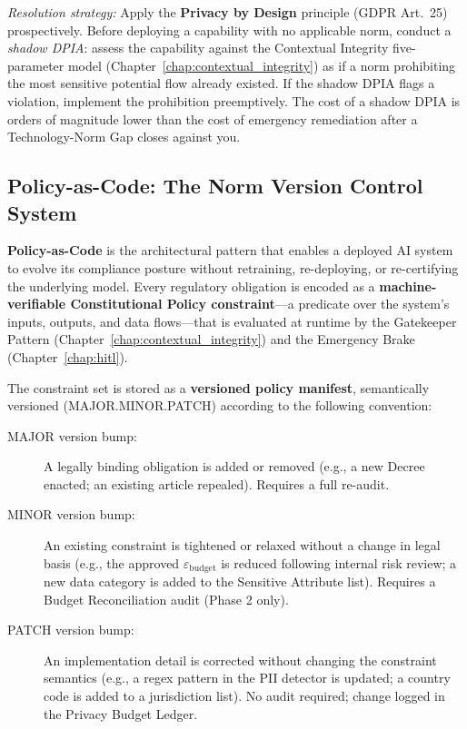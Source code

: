 \begin{description}
    \textit{Resolution strategy:} Apply the \textbf{Privacy by Design} principle (GDPR Art.~25) prospectively. Before deploying a capability with no applicable norm, conduct a \emph{shadow DPIA}: assess the capability against the Contextual Integrity five-parameter model (Chapter~\ref{chap:contextual_integrity}) as if a norm prohibiting the most sensitive potential flow already existed. If the shadow DPIA flags a violation, implement the prohibition preemptively. The cost of a shadow DPIA is orders of magnitude lower than the cost of emergency remediation after a Technology-Norm Gap closes against you.
\end{description}

\subsection{Policy-as-Code: The Norm Version Control System}
\label{subsec:policy_as_code}

\textbf{Policy-as-Code} is the architectural pattern that enables a deployed AI system to evolve its compliance posture without retraining, re-deploying, or re-certifying the underlying model. Every regulatory obligation is encoded as a \textbf{machine-verifiable Constitutional Policy constraint}---a predicate over the system's inputs, outputs, and data flows---that is evaluated at runtime by the Gatekeeper Pattern (Chapter~\ref{chap:contextual_integrity}) and the Emergency Brake (Chapter~\ref{chap:hitl}).

The constraint set is stored as a \textbf{versioned policy manifest}, semantically versioned (MAJOR.MINOR.PATCH) according to the following convention:

\begin{description}
  \item[MAJOR version bump:] A legally binding obligation is added or removed (e.g., a new Decree enacted; an existing article repealed). Requires a full re-audit.
  \item[MINOR version bump:] An existing constraint is tightened or relaxed without a change in legal basis (e.g., the approved $\varepsilon_{\text{budget}}$ is reduced following internal risk review; a new data category is added to the Sensitive Attribute list). Requires a Budget Reconciliation audit (Phase 2 only).
  \item[PATCH version bump:] An implementation detail is corrected without changing the constraint semantics (e.g., a regex pattern in the PII detector is updated; a country code is added to a jurisdiction list). No audit required; change logged in the Privacy Budget Ledger.
\end{description}

